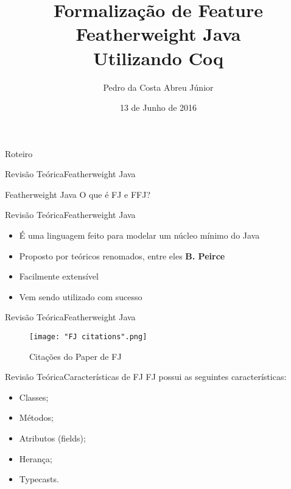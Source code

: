 \documentclass{beamer}
\title[Formalização de FFJ em Coq]{Formalização de Feature Featherweight Java \\ Utilizando Coq}
\author{Pedro da Costa Abreu Júnior}
\institute[UnB]
{
	Departamento de Ciência da Computação\\
	Universidade de Brasília 
}
\date{13 de Junho de 2016}
\begin{document}
	
	\begin{frame}
		\titlepage
	\end{frame}
	
	\begin{frame}{Roteiro}
		\tableofcontents
	\end{frame}
	
	\begin{frame}{Revisão Teórica}{Featherweight Java}
		\centering
		\begin{block}{Featherweight Java}
			O que é FJ e FFJ?
		\end{block}
	\end{frame}
	
	\begin{frame}{Revisão Teórica}{Featherweight Java}
		\centering
		\begin{itemize}
			\item {É uma linguagem feito para modelar um núcleo mínimo do Java}
			\item {Proposto por teóricos renomados, entre eles \textbf{B. Peirce}}
			\item Facilmente extensível
			\item Vem sendo utilizado com sucesso	
		\end{itemize}
	\end{frame}
	
	\begin{frame}{Revisão Teórica}{Featherweight Java}
		\centering
		\begin{figure}[h!]
			\texttt{[image: "FJ citations".png]}{}
			\caption[Quantidade de citações do Paper de FJ; This is the second line]
			{\tabular[t]{@{}l@{}}
				Citações do Paper de FJ \\ 
				\endtabular}
			
			\label{fig:fj-citations}
		\end{figure}
	\end{frame}
	
	\begin{frame}{Revisão Teórica}{Características de FJ}
		FJ possui as seguintes características:
		\begin{itemize}
			\item Classes;
			\item Métodos;
			\item Atributos (fields);
			\item Herança;
			\item Typecasts.
		\end{itemize}
	\end{frame}
	
\end{document}
